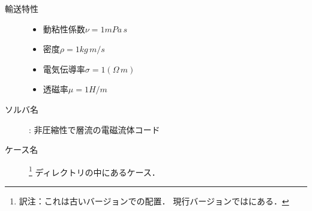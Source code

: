 \begin{description}
 \item[輸送特性] \mbox{}
            \begin{itemize}
             \item 動粘性係数$\nu = 1 \unit{mPa\,s}$
             \item 密度$\rho = 1 \unit{kg\,m/s}$
             \item 電気伝導率$\sigma = 1 \unit{(\Omega\,m)}$
             \item 透磁率$\mu = 1 \unit{H/m}$
            \end{itemize}
 \item[ソルバ名] : 非圧縮性で層流の電磁流体コード
 \item[ケース名] %
\footnote{訳注：これは古いバージョンでの配置．
現行バージョンではにある．}%
            ディレクトリの中にあるケース．
\end{description}


